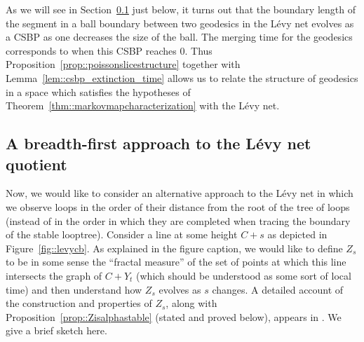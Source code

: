 \documentclass[10pt]{amsart}
\theoremstyle{plain}
\numberwithin{theorem}{section}
\theoremstyle{definition}
\begin{document}
As we will see in Section~\ref{subsec::levynetbreadthfirst} just below, it turns out that the boundary length of the segment in a ball boundary between two geodesics in the Lévy net evolves as a CSBP as one decreases the size of the ball. The merging time for the geodesics corresponds to when this CSBP reaches $0$. Thus Proposition~\ref{prop::poissonslicestructure} together with Lemma~\ref{lem::csbp_extinction_time} allows us to relate the structure of geodesics in a space which satisfies the hypotheses of Theorem~\ref{thm::markovmapcharacterization} with the Lévy net.

\subsection{A breadth-first approach to the Lévy net quotient}
\label{subsec::levynetbreadthfirst}

Now, we would like to consider an alternative approach to the Lévy net in which we observe loops in the order of their distance from the root of the tree of loops (instead of in the order in which they are completed when tracing the boundary of the stable looptree). Consider a line at some height $C+s$ as depicted in Figure~\ref{fig::levycb}. As explained in the figure caption, we would like to define $Z_s$ to be in some sense the ``fractal measure'' of the set of points at which this line intersects the graph of $C+Y_t$ (which should be understood as some sort of local time) and then understand how $Z_s$ evolves as $s$ changes. A detailed account of the construction and properties of $Z_s$, along with Proposition~\ref{prop::Zisalphastable} (stated and proved below), appears in \cite{duquesnelegall2005levytrees}. We give a brief sketch here.
\end{document}
